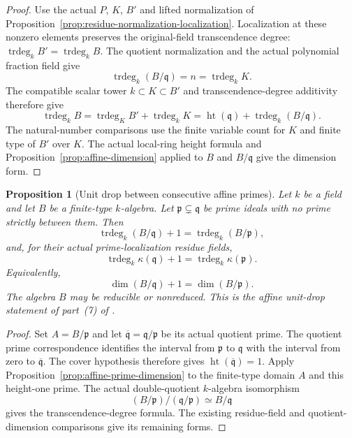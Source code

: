 \documentclass[11pt]{article}
\newtheorem{proposition}[theorem]{Proposition}
\theoremstyle{definition}
\theoremstyle{remark}
\begin{document}
\begin{proof}
Use the actual \(P\), \(K\), \(B'\) and lifted normalization of
Proposition~\ref{prop:residue-normalization-localization}.
Localization at these nonzero elements preserves the original-field
transcendence degree:
\(\operatorname{trdeg}_k B'=\operatorname{trdeg}_k B\).
The quotient normalization and the actual polynomial fraction field give
\[
  \operatorname{trdeg}_k(B/\mathfrak q)
    =n=\operatorname{trdeg}_k K.
\]
The compatible scalar tower \(k\subset K\subset B'\) and
transcendence-degree additivity \cite{StacksTranscendenceDegreeTower}
therefore give
\[
  \operatorname{trdeg}_k B
    =\operatorname{trdeg}_K B'+\operatorname{trdeg}_k K
    =\operatorname{ht}(\mathfrak q)
      +\operatorname{trdeg}_k(B/\mathfrak q).
\]
The natural-number comparisons use the finite variable count for
\(K\) and finite type of \(B'\) over \(K\).
The actual local-ring height formula and
Proposition~\ref{prop:affine-dimension} applied to \(B\) and
\(B/\mathfrak q\) give the dimension form.
\end{proof}

\begin{proposition}[Unit drop between consecutive affine primes]
\label{prop:consecutive-prime-dimension}
Let \(k\) be a field and let \(B\) be a finite-type \(k\)-algebra.
Let \(\mathfrak p\subsetneq\mathfrak q\) be prime ideals with no
prime strictly between them. Then
\[
  \operatorname{trdeg}_k(B/\mathfrak q)+1
    =\operatorname{trdeg}_k(B/\mathfrak p),
\]
and, for their actual prime-localization residue fields,
\[
  \operatorname{trdeg}_k\kappa(\mathfrak q)+1
    =\operatorname{trdeg}_k\kappa(\mathfrak p).
\]
Equivalently,
\[
  \dim(B/\mathfrak q)+1=\dim(B/\mathfrak p).
\]
The algebra \(B\) may be reducible or nonreduced.
This is the affine unit-drop statement of part~(7) of
\cite{StacksAlgebraicSchemeDimension}.
\end{proposition}

\begin{proof}
Set \(A=B/\mathfrak p\) and let
\(\overline{\mathfrak q}=\mathfrak q/\mathfrak p\) be its actual
quotient prime. The quotient prime correspondence identifies the
interval from \(\mathfrak p\) to \(\mathfrak q\) with the interval
from zero to \(\overline{\mathfrak q}\). The cover hypothesis therefore
gives \(\operatorname{ht}(\overline{\mathfrak q})=1\).
Apply Proposition~\ref{prop:affine-prime-dimension} to the finite-type
domain \(A\) and this height-one prime. The actual double-quotient
\(k\)-algebra isomorphism
\[
  (B/\mathfrak p)/(\mathfrak q/\mathfrak p)
    \simeq B/\mathfrak q
\]
gives the transcendence-degree formula. The existing residue-field
and quotient-dimension comparisons give its remaining forms.
\end{proof}
\end{document}
